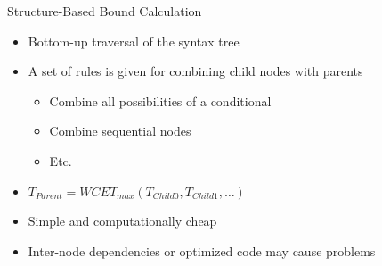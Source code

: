 \documentclass{beamer}
\begin{document}
\begin{frame}{Structure-Based Bound Calculation}
  \begin{itemize}
    \item Bottom-up traversal of the syntax tree
    \item A set of rules is given for combining child nodes with parents
      \begin{itemize}
        \item Combine all possibilities of a conditional
        \item Combine sequential nodes
        \item Etc.
      \end{itemize}
    \item $T_{Parent} = WCET_{max}(T_{Child0}, T_{Child1},\dots)$
    \item Simple and computationally cheap
    \item Inter-node dependencies or optimized code may cause problems
  \end{itemize}
\end{frame}
\end{document}
